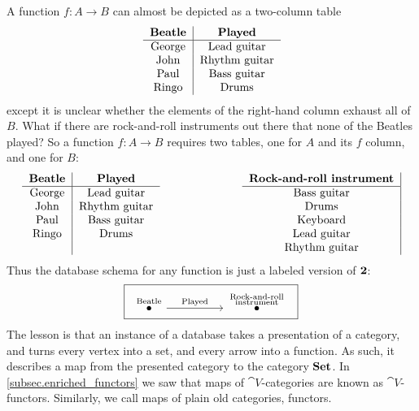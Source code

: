 \documentclass[7Sketches]{subfiles}
\begin{document}
A function $f\colon A\to B$ can almost be depicted as a two-column table
\[
\begin{tabular}{ c | c}
  \textbf{Beatle}&\textbf{Played}\\\hline
  George&Lead guitar\\
  John&Rhythm guitar\\
  Paul&Bass guitar\\
  Ringo&Drums
\end{tabular}
\]
except it is unclear whether the elements of the right-hand column exhaust all of $B$. What if there are rock-and-roll instruments out there that none of the Beatles played? So a function $f\colon A\to B$ requires two tables, one for $A$ and its $f$ column, and one for $B$:
\[
\begin{tabular}{ c | c}
  \textbf{Beatle}&\textbf{Played}\\\hline
  George&Lead guitar\\
  John&Rhythm guitar\\
  Paul&Bass guitar\\
  Ringo&Drums\\
  ~
\end{tabular}
\hspace{1in}
\begin{tabular}{ c |}
  \textbf{Rock-and-roll instrument}\\\hline
  Bass guitar\\
  Drums\\
  Keyboard\\
  Lead guitar\\
  Rhythm guitar
 \end{tabular}
\]
Thus the database schema for any function is just a labeled version of $\mathbf{2}$:%
\[
\fbox{
\begin{tikzcd}[ampersand replacement=\&, column sep=50pt]
	\LTO{Beatle}\ar[r, "\text{Played}"]\&\LTO{\parbox{.7in}{\centering Rock-and-roll\\\vspace{-.1in}instrument}}
\end{tikzcd}
}
\]
The lesson is that an instance of a database takes a presentation of a category,
and turns every vertex into a set, and every arrow into a function. As such, it
describes a map from the presented category to the category $\mathbf{Set}$. In
\cref{subsec.enriched_functors} we saw that maps of $\cat{V}$-categories are
known as $\cat{V}$-functors. Similarly, we call maps of plain old categories,
functors.
\end{document}
